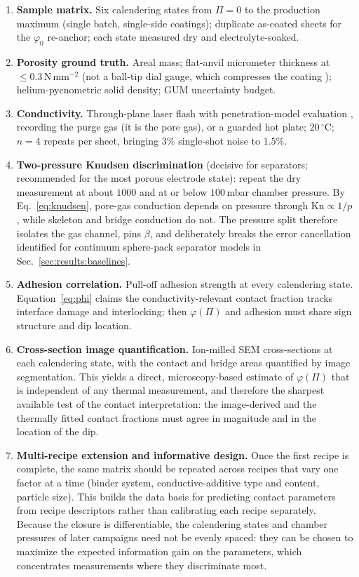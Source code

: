 \documentclass[10pt,a4paper]{article}
\newcommand{\Kn}{\mathrm{Kn}}
\begin{document}
\begin{enumerate}
\item \textbf{Sample matrix.} Six calendering states from $\Pi=0$ to the production maximum (single batch, single-side coatings); duplicate as-coated sheets for the $\varphi_0$ re-anchor; each state measured dry and electrolyte-soaked.
\item \textbf{Porosity ground truth.} Areal mass; flat-anvil micrometer thickness at $\le0.3\,\mathrm{N\,mm^{-2}}$ (not a ball-tip dial gauge, which compresses the coating \cite{gandert2023}); helium-pycnometric solid density; GUM uncertainty budget.
\item \textbf{Conductivity.} Through-plane laser flash with penetration-model evaluation \cite{mcmasters}, recording the purge gas (it is the pore gas), or a guarded hot plate; $20\,^\circ$C; $n=4$ repeats per sheet, bringing $3\%$ single-shot noise to $1.5\%$.
\item \textbf{Two-pressure Knudsen discrimination} (decisive for separators; recommended for the most porous electrode state): repeat the dry measurement at about $1000$ and at or below $100$\,mbar chamber pressure. By Eq.~\eqref{eq:knudsen}, pore-gas conduction depends on pressure through $\Kn\propto1/p$, while skeleton and bridge conduction do not. The pressure split therefore isolates the gas channel, pins $\beta$, and deliberately breaks the error cancellation identified for continuum sphere-pack separator models in Sec.~\ref{sec:results:baselines}.
\item \textbf{Adhesion correlation.} Pull-off adhesion strength at every calendering state. Equation~\eqref{eq:phi} claims the conductivity-relevant contact fraction tracks interface damage and interlocking; then $\varphi(\Pi)$ and adhesion must share sign structure and dip location.
\item \textbf{Cross-section image quantification.} Ion-milled SEM cross-sections at each calendering state, with the contact and bridge areas quantified by image segmentation. This yields a direct, microscopy-based estimate of $\varphi(\Pi)$ that is independent of any thermal measurement, and therefore the sharpest available test of the contact interpretation: the image-derived and the thermally fitted contact fractions must agree in magnitude and in the location of the dip.
\item \textbf{Multi-recipe extension and informative design.} Once the first recipe is complete, the same matrix should be repeated across recipes that vary one factor at a time (binder system, conductive-additive type and content, particle size). This builds the data basis for predicting contact parameters from recipe descriptors rather than calibrating each recipe separately. Because the closure is differentiable, the calendering states and chamber pressures of later campaigns need not be evenly spaced: they can be chosen to maximize the expected information gain on the parameters, which concentrates measurements where they discriminate most.

\end{enumerate}
\end{document}

